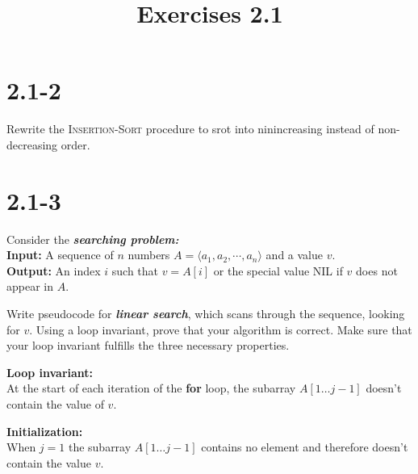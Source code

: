 \documentclass{article}
\title{Exercises 2.1}
\date{}
\author{}
\begin{document}
\maketitle
\section{2.1-2}

Rewrite the \textsc{Insertion-Sort} procedure to srot into ninincreasing instead of non-decreasing order.\\

\begin{algorithmic}
        \ENDWHILE
    \ENDFOR
\end{algorithmic}


\section{2.1-3}

Consider the \textit{\textbf{searching problem:}}\\

\textbf{Input:} A sequence of \(n\) numbers \(A = \langle a_1, a_2, \cdots, a_n \rangle\) and a value \(v\).\\
\textbf{Output:} An index \(i\) such that \(v = A[i]\) or the special value NIL if \(v\) does not appear in \(A\).

Write pseudocode for \textit{\textbf{linear search}}, which scans through the sequence, looking for \(v\). Using a loop invariant, prove that your algorithm is correct. Make sure that your loop invariant fulfills the three necessary properties.\\

\begin{algorithmic}
        \ENDIF
    \ENDFOR
\end{algorithmic}

\textbf{Loop invariant:}\\
At the start of each iteration of the \textbf{for} loop, the subarray \(A[1\hdots j-1]\) doesn't contain the value of \(v\).

\textbf{Initialization:}\\
When \(j = 1\) the subarray \(A[1\hdots j - 1]\) contains no element and therefore doesn't contain the value \(v\).
\end{document}
